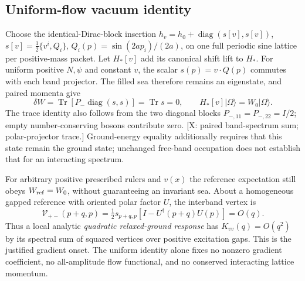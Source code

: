 \subsection*{Uniform-flow vacuum identity}
Choose the identical-Dirac-block insertion
$h_v=h_0+\operatorname{diag}(s[v],s[v])$,
$s[v]=\tfrac12\{v^i,Q_i\}$, $Q_i(p)=\sin(2ap_i)/(2a)$,
on one full periodic sine lattice per positive-mass packet.
Let $H_*[v]$ add its canonical shift lift to $H_*$.
For uniform positive $N,\psi$ and constant $v$, the scalar
$s(p)=v\cdot Q(p)$ commutes with each band projector.
The filled sea therefore remains an eigenstate, and paired momenta give
\[
 \delta W=\operatorname{Tr}
   [P_-\operatorname{diag}(s,s)]
   =\operatorname{Tr}s=0,\qquad
 H_*[v]|\Omega\rangle=W_0|\Omega\rangle .
\]
The trace identity also follows from the two diagonal blocks
$P_{-,11}=P_{-,22}=I/2$; empty number-conserving bosons contribute zero.
[X: paired band-spectrum sum; polar-projector trace.]
Ground-energy equality additionally requires that this state remain
the ground state; unchanged free-band occupation does not establish
that for an interacting spectrum.

For arbitrary positive prescribed rulers and $v(x)$ the reference
expectation still obeys $W_{\rm ref}=W_0$, without guaranteeing
an invariant sea.  About a homogeneous gapped reference with
oriented polar factor $U$, the interband vertex is
\[
 \mathcal V_{+-}(p+q,p)
 =\tfrac12s_{p+q,p}
       [I-U^\dagger(p+q)U(p)]=O(q).
\]
Thus a local analytic \emph{quadratic relaxed-ground response} has
$K_{vv}(q)=O(q^2)$ by its spectral sum of squared vertices over
positive excitation gaps.  This is the justified gradient onset.
The uniform identity alone fixes no nonzero gradient coefficient,
no all-amplitude flow functional, and no conserved interacting
lattice momentum.

